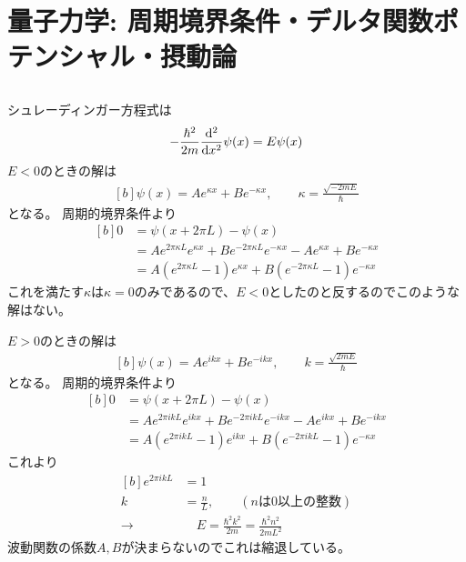 \documentclass[../../sp_2014.tex]{subfiles}
\begin{document}
\section{量子力学: 周期境界条件・デルタ関数ポテンシャル・摂動論}
\subsection{}
シュレーディンガー方程式は
\begin{equation}\begin{aligned}[b]
    -\frac{\hbar^2}{2m}\dv[2]{x}\psi(x)=E\psi(x)
\end{aligned}\end{equation}
\(E<0\)のときの解は
\begin{equation}\begin{aligned}[b]
    \psi(x) = Ae^{\kappa x}+Be^{-\kappa x}, \qquad \kappa = \frac{\sqrt{-2mE}}{\hbar}
\end{aligned}\end{equation}
となる。
周期的境界条件より
\begin{equation}\begin{aligned}[b]
    0&=\psi(x+2\pi L)-\psi(x)\\
    &= Ae^{2\pi\kappa L}e^{\kappa x} + Be^{-2\pi\kappa L}e^{-\kappa x}-Ae^{\kappa x}+Be^{-\kappa x}\\
    &= A(e^{2\pi\kappa L}-1)e^{\kappa x} + B(e^{-2\pi\kappa L}-1)e^{-\kappa x}
\end{aligned}\end{equation}
これを満たす\(\kappa\)は\(\kappa=0\)のみであるので、\(E<0\)としたのと反するのでこのような解はない。

\(E>0\)のときの解は
\begin{equation}\begin{aligned}[b]
    \psi(x) = Ae^{ik x}+Be^{-ik x}, \qquad k = \frac{\sqrt{2mE}}{\hbar}
\end{aligned}\end{equation}
となる。
周期的境界条件より
\begin{equation}\begin{aligned}[b]
    0&=\psi(x+2\pi L)-\psi(x)\\
    &= Ae^{2\pi ikL}e^{ik x} + Be^{-2\pi ikL}e^{-ikx}-Ae^{ikx}+Be^{-ikx}\\
    &= A(e^{2\pi ikL}-1)e^{ikx} + B(e^{-2\pi ikL}-1)e^{-\kappa x}
\end{aligned}\end{equation}
これより
\begin{equation}\begin{aligned}[b]
    e^{2\pi ikL} &= 1\\
    k &= \frac{n}{L},\qquad(n\text{は0以上の整数})\\
    \rightarrow& \quad  E= \frac{\hbar^2k^2}{2m}=\frac{\hbar^2 n^2}{2mL^2}
\end{aligned}\end{equation}
波動関数の係数\(A,B\)が決まらないのでこれは縮退している。
\end{document}
